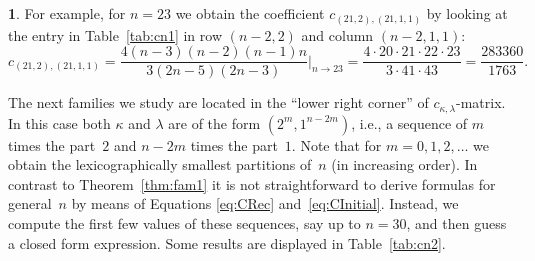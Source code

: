 \documentclass{mathincs}
\numberwithin{equation}{section}
\numberwithin{figure}{section}
\theoremstyle{plain}
\theoremstyle{definition}
\theoremstyle{remark}
\theoremstyle{plain}
\theoremstyle{definition}
\newtheorem{example}[thm]{\protect\examplename}
\theoremstyle{plain}
\theoremstyle{plain}
\providecommand{\examplename}{Example}
\begin{document}
\begin{example}
For example, for $n=23$ we obtain the coefficient $c_{(21,2),(21,1,1)}$ by
looking at the entry in Table~\ref{tab:cn1} in row $(n-2,2)$ and column
$(n-2,1,1)$:
\[
  c_{(21,2),(21,1,1)} = \frac{4 (n-3) (n-2) (n-1) n}{3 (2 n-5) (2 n-3)} \Big|_{n\to23}
  = \frac{4 \cdot 20 \cdot 21 \cdot 22 \cdot 23}{3 \cdot 41 \cdot 43}
  = \frac{283360}{1763}.
\]
\end{example}

The next families we study are located in the ``lower right corner'' of
$c_{\kappa,\lambda}$-matrix. In this case both $\kappa$ and $\lambda$ are of
the form $(2^m,1^{n-2m})$, i.e., a sequence of $m$ times the part~$2$ and
$n-2m$ times the part~$1$. Note that for $m=0,1,2,\dots$ we obtain the
lexicographically smallest partitions of~$n$ (in increasing order).  In
contrast to Theorem~\ref{thm:fam1} it is not straightforward to derive
formulas for general~$n$ by means of Equations \eqref{eq:CRec}
and~\eqref{eq:CInitial}. Instead, we compute the first few values of these
sequences, say up to $n=30$, and then guess a closed form expression.
Some results are displayed in Table~\ref{tab:cn2}.
\end{document}
